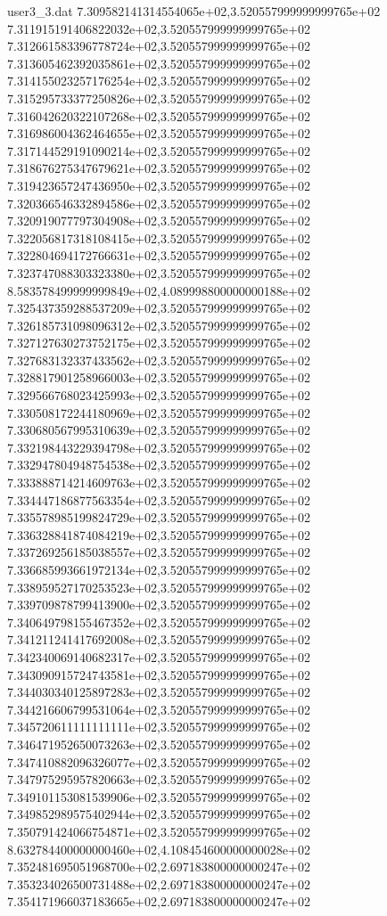 \begin{filecontents}{user3_3.dat}
7.309582141314554065e+02,3.520557999999999765e+02
7.311915191406822032e+02,3.520557999999999765e+02
7.312661583396778724e+02,3.520557999999999765e+02
7.313605462392035861e+02,3.520557999999999765e+02
7.314155023257176254e+02,3.520557999999999765e+02
7.315295733377250826e+02,3.520557999999999765e+02
7.316042620322107268e+02,3.520557999999999765e+02
7.316986004362464655e+02,3.520557999999999765e+02
7.317144529191090214e+02,3.520557999999999765e+02
7.318676275347679621e+02,3.520557999999999765e+02
7.319423657247436950e+02,3.520557999999999765e+02
7.320366546332894586e+02,3.520557999999999765e+02
7.320919077797304908e+02,3.520557999999999765e+02
7.322056817318108415e+02,3.520557999999999765e+02
7.322804694172766631e+02,3.520557999999999765e+02
7.323747088303323380e+02,3.520557999999999765e+02
8.583578499999999849e+02,4.089998800000000188e+02
7.325437359288537209e+02,3.520557999999999765e+02
7.326185731098096312e+02,3.520557999999999765e+02
7.327127630273752175e+02,3.520557999999999765e+02
7.327683132337433562e+02,3.520557999999999765e+02
7.328817901258966003e+02,3.520557999999999765e+02
7.329566768023425993e+02,3.520557999999999765e+02
7.330508172244180969e+02,3.520557999999999765e+02
7.330680567995310639e+02,3.520557999999999765e+02
7.332198443229394798e+02,3.520557999999999765e+02
7.332947804948754538e+02,3.520557999999999765e+02
7.333888714214609763e+02,3.520557999999999765e+02
7.334447186877563354e+02,3.520557999999999765e+02
7.335578985199824729e+02,3.520557999999999765e+02
7.336328841874084219e+02,3.520557999999999765e+02
7.337269256185038557e+02,3.520557999999999765e+02
7.336685993661972134e+02,3.520557999999999765e+02
7.338959527170253523e+02,3.520557999999999765e+02
7.339709878799413900e+02,3.520557999999999765e+02
7.340649798155467352e+02,3.520557999999999765e+02
7.341211241417692008e+02,3.520557999999999765e+02
7.342340069140682317e+02,3.520557999999999765e+02
7.343090915724743581e+02,3.520557999999999765e+02
7.344030340125897283e+02,3.520557999999999765e+02
7.344216606799531064e+02,3.520557999999999765e+02
7.345720611111111111e+02,3.520557999999999765e+02
7.346471952650073263e+02,3.520557999999999765e+02
7.347410882096326077e+02,3.520557999999999765e+02
7.347975295957820663e+02,3.520557999999999765e+02
7.349101153081539906e+02,3.520557999999999765e+02
7.349852989575402944e+02,3.520557999999999765e+02
7.350791424066754871e+02,3.520557999999999765e+02
8.632784400000000460e+02,4.108454600000000028e+02
7.352481695051968700e+02,2.697183800000000247e+02
7.353234026500731488e+02,2.697183800000000247e+02
7.354171966037183665e+02,2.697183800000000247e+02

\end{filecontents}

